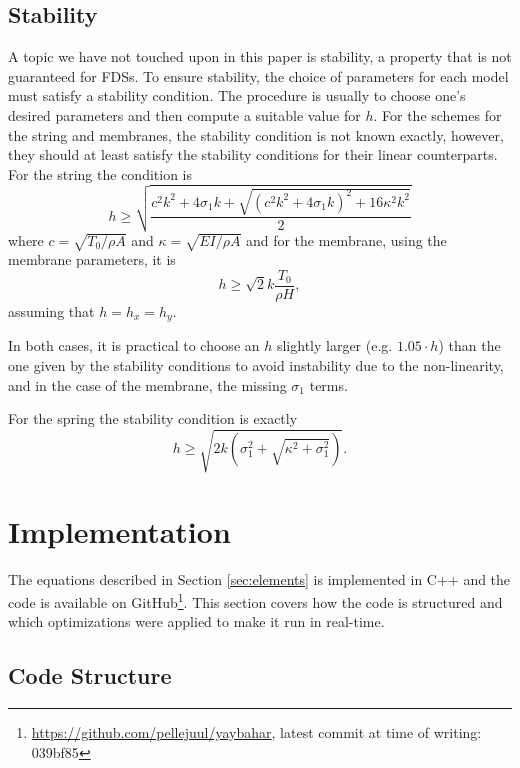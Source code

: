 \documentclass{article}
\begin{document}
\subsection{Stability}

A topic we have not touched upon in this paper is stability, a property that is not guaranteed for FDSs.
To ensure stability, the choice of parameters for each model must satisfy a stability condition.
The procedure is usually to choose one's desired parameters and then compute a suitable value for $h$.
For the schemes for the string and membranes, the stability condition is not known exactly, however, they should at least satisfy the stability conditions for their linear counterparts.
For the string the condition is\cite{willemsen_real-time_2019}
\begin{equation}
    h \geq \sqrt{\frac{c^2 k^2 + 4\sigma_1k + \sqrt{(c^2 k^2 + 4\sigma_1k)^2 + 16 \kappa^2 k^2}}{2}}
\end{equation}
where $c = \sqrt{T_0 / \rho A}$ and $\kappa = \sqrt{EI / \rho A}$ and for the membrane, using the membrane parameters, it is\cite[Chapter~11]{bilbao_numerical_2009}
\begin{equation}
    h \geq \sqrt{2} k \frac{T_0}{\rho H},
\end{equation}
assuming that $h = h_x = h_y$.

In both cases, it is practical to choose an $h$ slightly larger (e.g. $1.05 \cdot h$) than the one given by the stability conditions to avoid instability due to the non-linearity, and in the case of the membrane, the missing $\sigma_1$ terms.

For the spring the stability condition is exactly\cite{bilbao_modular_2009}
\begin{equation}
    h \geq \sqrt{2 k \left( \sigma_1^2 + \sqrt{\kappa^2 + \sigma_1^2} \right)}.
\end{equation}

\section{Implementation}
\label{sec:implementation}

The equations described in Section \ref{sec:elements} is implemented in C++ and the code is available on GitHub\footnote{\url{https://github.com/pellejuul/yaybahar}, latest commit at time of writing: 039bf85}.
This section covers how the code is structured and which optimizations were applied to make it run in real-time.

\subsection{Code Structure}
\end{document}
